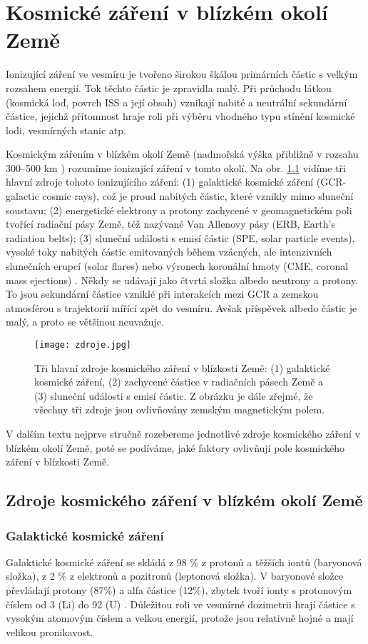 \chapter{Kosmické záření v blízkém okolí Země}
Ionizující záření ve vesmíru je tvořeno širokou škálou primárních částic s velkým rozsahem energií. Tok těchto částic je zpravidla malý. Při průchodu látkou (kosmická loď, povrch ISS a její obsah) vznikají nabité a neutrální sekundární částice, jejichž přítomnost hraje roli při výběru vhodného typu stínění kosmické lodi, vesmírných stanic atp.   

Kosmickým zářením v blízkém okolí Země (nadmořská výška přibližně v rozsahu 300--500 km \cite{japonsky}) rozumíme ionizující záření v tomto okolí. Na obr. \ref{fig:zdroje} vidíme tři hlavní zdroje tohoto ionizujícího záření: (1) galaktické kosmické záření (GCR-galactic cosmic rays), což je proud nabitých částic, které vznikly mimo sluneční soustavu; (2) energetické elektrony a protony zachycené v geomagnetickém poli tvořící radiační pásy Země, též nazývané Van Allenovy pásy (ERB, Earth's radiation belts); (3) sluneční události s emisí částic (SPE, solar particle events), vysoké toky nabitých částic emitovaných během vzácných, ale intenzivních slunečních erupcí (solar flares) nebo výronech koronální hmoty (CME, coronal mass ejections) \cite{benton}. Někdy se udávají jako čtvrtá
složka albedo neutrony a protony. To jsou sekundární částice vzniklé při interakcích mezi GCR a zemskou atmosférou s trajektorií mířící zpět do vesmíru. Avšak příspěvek albedo částic je malý, a proto se většinou neuvažuje.

\begin{figure}[ht]
  \centering
  \texttt{[image: zdroje.jpg]}
  \caption{Tři hlavní zdroje kosmického záření v blízkosti Země: (1) galaktické kosmické záření, (2) zachycené částice v radiačních pásech Země a (3) sluneční události s emisí částic. Z obrázku je dále zřejmé, že všechny tři zdroje jsou ovlivňovány zemským magnetickým polem. \cite{benton}}
  \label{fig:zdroje}
\end{figure}

V dalším textu nejprve stručně rozebereme jednotlivé zdroje kosmického záření v blízkém okolí Země, poté se podíváme, jaké faktory ovlivňují pole kosmického záření v blízkosti Země.
\section{Zdroje kosmického záření v blízkém okolí Země}
\subsection{Galaktické kosmické záření}
Galaktické kosmické záření se skládá z 98 \% z protonů a těžších iontů (baryonová složka), z 2 \% z elektronů a pozitronů (leptonová složka). V baryonové složce převládají protony (87\%) a alfa částice (12\%), zbytek tvoří ionty s protonovým číslem od 3 (Li) do 92 (U) \cite{benton}. Důležitou roli ve vesmírné dozimetrii hrají částice s vysokým atomovým číslem a velkou energií, protože jsou relativně hojné a mají velikou pronikavost.

